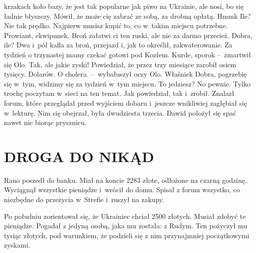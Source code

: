 \documentclass[../MAIN.tex]{subfiles}
\begin{document}
krzakach koło bazy, że jest tak popularne jak piwo na Ukrainie, ale nosi, bo się
ładnie błyszczy. Mówił, że może cię zabrać ze sobą, za drobną opłatą.
\xx Hmm\3k Ile?
\xx Nie tak prędko. Najpierw musisz kupić to, co w~takim miejscu potrzebne.
Prowiant, ekwipunek. Broń załatwi ci ten ruski, ale nie za darmo przecież.
\xx Dobra, ile?
\xx Dwa i~pół kafla za broń, przejazd i, jak to określił, zakwaterowanie. Za
tydzień o trzynastej mamy czekać gotowi pod Kozłem.
\xx Kurde, sporo\3k --~zmartwił się Olo.
\xx Tak, ale jakie zyski! Powiedział, że przez trzy miesiące zarobił osiem
tysięcy. Dolarów.
\xx O cholera. --~wybałuszył oczy Olo.
\xx Właśnie\3k
\xx Dobra, pogrzebię się w~tym, widzimy się za tydzień w~tym miejscu.
\xx To jedziesz?
\xx No pewnie. Tylko trochę poczytam w~sieci na ten temat.
\qd
\hspace{26em} Jak powiedział, tak i~zrobił. Znalazł forum, które przeglądał przed wyjściem dobaru i~jeszcze wnikliwiej zagłębiał się w~lekturę. Nim się obejrzał, była
dwudziesta trzecia. Dawid położył się spać nawet nie biorąc prysznicu.
\section*{DROGA DO NIKĄD}
\mm Rano poszedł do banku. Miał na koncie 2283 złote, odłożone na czarną godzinę.
Wyciągnął wszystkie pieniądze i~wrócił do domu. Spisał z forum wszystko, co
niezbędne do przeżycia w~Strefie i~ruszył na zakupy.

Po południu zorientował się, że Ukrainiec chciał 2500 złotych. Musiał zdobyć te
pieniądze. Pogadał z jedyną osobą, jaka mu została: z Rudym. Ten pożyczył mu
tysiąc złotych, pod warunkiem, że podzieli się z nim przynajmniej początkowymi
zyskami.
\end{document}

